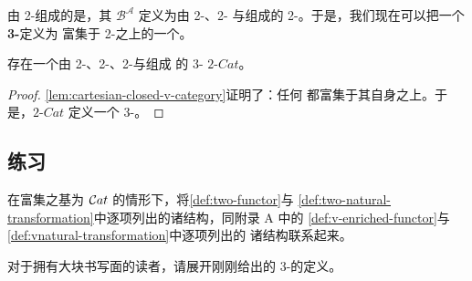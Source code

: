 \begin{definition}
\begin{center}
\end{center}
\end{definition}

由 2-\trCategory{}组成的\trCategory{}是\trCartesianClosed，其\trInternalHom{}
$\mathcal{B}^{\mathcal{A}}$ 定义为由 2-\trFunctor、2-\trNaturalTransformation{}%
与\trModification{}组成的 2-\trCategory。于是，我们现在可以把一个\textbf{3-\trCategory}定义为
富集于 2-\trCategory{}之上的一个\trCategory。

\begin{corollary}\label{cor:two-cat-three-category}
存在一个由 2-\trCategory、2-\trFunctor、2-\trNaturalTransformation{}与\trModification{}组成
的 3-\trCategory{} $2\text{-}\mathit{Cat}$。
\end{corollary}

\begin{proof}
\cref{lem:cartesian-closed-v-category}证明了：任何\trCartesianClosed{}%
\trCategory{}都富集于其自身之上。于是，$2\text{-}\mathit{Cat}$ 定义一个
3-\trCategory。
\end{proof}

\subsection*{练习}

\begin{exercise}\label{ex:relate-two-category-structures}
在富集之基为 $\mathcal{C}at$ 的情形下，将\cref{def:two-functor}与%
\cref{def:two-natural-transformation}中逐项列出的诸结构，同附录 A 中的%
\cref{def:v-enriched-functor}与\cref{def:vnatural-transformation}中逐项列出的
诸结构联系起来。
\end{exercise}

\begin{exercise}\label{ex:unpack-3-category-definition}
对于拥有大块书写面的读者，请展开刚刚给出的 3-\trCategory{}的定义。
\end{exercise}

